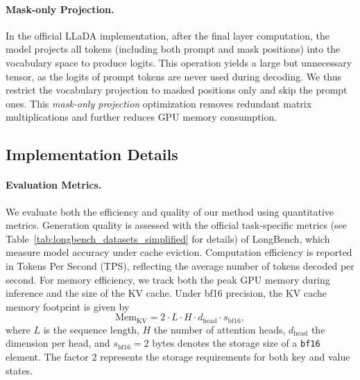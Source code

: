 \paragraph{Mask-only Projection.}
In the official LLaDA implementation, after the final layer computation, the model projects all tokens (including both prompt and mask positions) into the vocabulary space to produce logits.
This operation yields a large but unnecessary tensor, as the logits of prompt tokens are never used during decoding.
We thus restrict the vocabulary projection to masked positions only and skip the prompt ones.
This \emph{mask-only projection} optimization removes redundant matrix multiplications and further reduces GPU memory consumption.

\subsection{Implementation Details}
\label{implement details}
\paragraph{Evaluation Metrics.}
We evaluate both the efficiency and quality of our method using quantitative metrics. 
Generation quality is assessed with the official task-specific metrics (see Table~\ref{tab:longbench_datasets_simplified} for details) of LongBench, which measure model accuracy under cache eviction.  
Computation efficiency is reported in Tokens Per Second (TPS), reflecting the average number of tokens decoded per second.  
For memory efficiency, we track both the peak GPU memory during inference and the size of the KV cache.  
Under bf16 precision, the KV cache memory footprint is given by  
\begin{equation}
\text{Mem}_{\text{KV}} = 2 \cdot L \cdot H \cdot d_{\text{head}} \cdot s_{\text{bf16}},
\end{equation}
where $L$ is the sequence length, $H$ the number of attention heads, $d_{\text{head}}$ the dimension per head, and $s_{\text{bf16}}=2$ bytes denotes the storage size of a \texttt{bf16} element.  
The factor $2$ represents the storage requirements for both key and value states.

